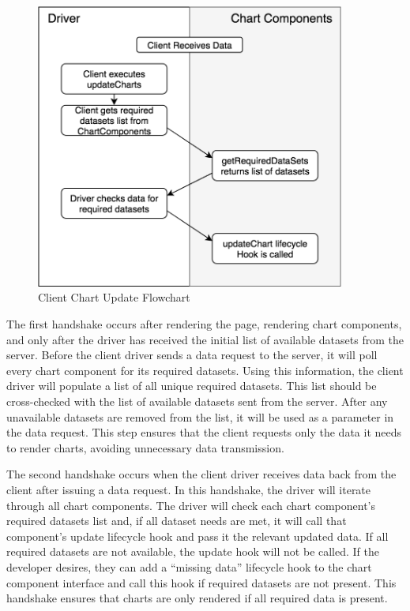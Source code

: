 \begin{figure}
   \centering
   \includegraphics[width=4in]{images/ClientChartUpdateFlow.png}
   \caption{Client Chart Update Flowchart}
   \label{fig:client-update-flow}
\end{figure}

The first handshake occurs after rendering the page, rendering chart components, and only after the driver has received the initial list of available datasets from the server.  Before the client driver sends a data request to the server, it will poll every chart component for its required datasets.  Using this information, the client driver will populate a list of all unique required datasets.  This list should be cross-checked with the list of available datasets sent from the server.  After any unavailable datasets are removed from the list, it will be used as a parameter in the data request.  This step ensures that the client requests only the data it needs to render charts, avoiding unnecessary data transmission. \par
The second handshake occurs when the client driver receives data back from the client after issuing a data request.  In this handshake, the driver will iterate through all chart components.  The driver will check each chart component’s required datasets list and, if all dataset needs are met, it will call that component’s update lifecycle hook and pass it the relevant updated data.  If all required datasets are not available, the update hook will not be called.  If the developer desires, they can add a “missing data” lifecycle hook to the chart component interface and call this hook if required datasets are not present.  This handshake ensures that charts are only rendered if all required data is present. \par

